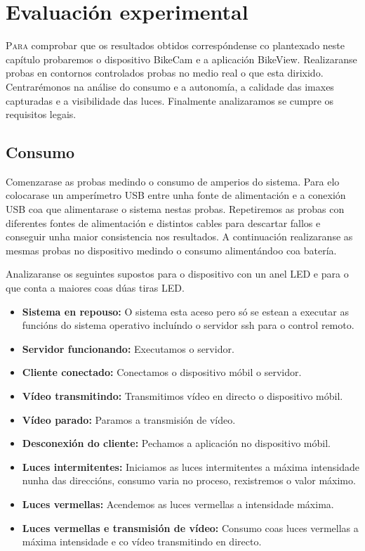\chapter{Evaluación experimental}
\label{chap:evaluacion_experimenal}
\lettrine{P}{ara} comprobar que os resultados obtidos correspóndense co plantexado neste capítulo probaremos o dispositivo BikeCam e a aplicación BikeView. Realizaranse probas en contornos controlados probas no medio real o que esta dirixido. Centrarémonos na análise do consumo e a autonomía, a calidade das imaxes capturadas e a visibilidade das luces. Finalmente analizaramos se cumpre os requisitos legais.

\section{Consumo}

Comenzarase as probas medindo o consumo de amperios do sistema. Para elo colocarase un amperímetro USB entre unha fonte de alimentación e a conexión USB coa que alimentarase o sistema nestas probas. Repetiremos as probas con diferentes fontes de alimentación e distintos cables para descartar fallos e conseguir unha maior consistencia nos resultados. A continuación realizaranse as mesmas probas no dispositivo medindo o consumo alimentándoo coa batería.

Analizaranse os seguintes supostos para o dispositivo con un anel LED e para o que conta a maiores coas dúas tiras LED.
\begin{itemize}
    \item \textbf{Sistema en repouso: }
    O sistema esta aceso pero só se estean a executar as funcións do sistema operativo incluíndo o servidor ssh para o control remoto.
    \item \textbf{Servidor funcionando:}
    Executamos o servidor.
    \item \textbf{Cliente conectado:}
    Conectamos o dispositivo móbil o servidor.
    \item \textbf{Vídeo transmitindo:}
    Transmitimos vídeo en directo o dispositivo móbil.
    \item \textbf{Vídeo parado:}
    Paramos a transmisión de vídeo.
    \item \textbf{Desconexión do cliente:}
    Pechamos a aplicación no dispositivo móbil.
    \item \textbf{Luces intermitentes:}
    Iniciamos as luces intermitentes a máxima intensidade nunha das direccións, consumo varia no proceso, rexistremos o valor máximo.
    \item \textbf{Luces vermellas:}
    Acendemos as luces vermellas a intensidade máxima.
    \item \textbf{Luces vermellas e transmisión de vídeo:}
    Consumo coas luces vermellas a máxima intensidade e co vídeo transmitindo en directo.
\end{itemize}

